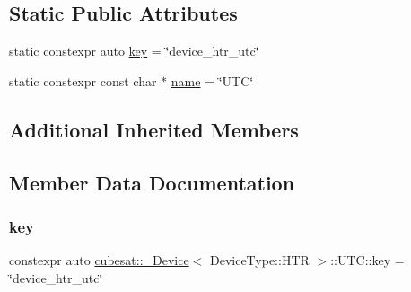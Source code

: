 \subsection*{Static Public Attributes}
\begin{DoxyCompactItemize}
\item 
static constexpr auto \hyperlink{structcubesat_1_1__Device_3_01DeviceType_1_1HTR_01_4_1_1UTC_a2541e2405ee93283e4a74d9f67c6e441}{key} = \char`\"{}device\+\_\+htr\+\_\+utc\char`\"{}
\item 
static constexpr const char $\ast$ \hyperlink{structcubesat_1_1__Device_3_01DeviceType_1_1HTR_01_4_1_1UTC_a2522369a6f735591e5bac98165f20464}{name} = \char`\"{}U\+TC\char`\"{}
\end{DoxyCompactItemize}
\subsection*{Additional Inherited Members}


\subsection{Member Data Documentation}
\mbox{\label{structcubesat_1_1__Device_3_01DeviceType_1_1HTR_01_4_1_1UTC_a2541e2405ee93283e4a74d9f67c6e441}} 
\subsubsection{\texorpdfstring{key}{key}}
{\footnotesize\ttfamily constexpr auto \hyperlink{structcubesat_1_1__Device}{cubesat\+::\+\_\+\+Device}$<$ Device\+Type\+::\+H\+TR $>$\+::U\+T\+C\+::key = \char`\"{}device\+\_\+htr\+\_\+utc\char`\"{}\hspace{0.3cm}{\ttfamily [static]}}

\mbox{\label{structcubesat_1_1__Device_3_01DeviceType_1_1HTR_01_4_1_1UTC_a2522369a6f735591e5bac98165f20464}} 
